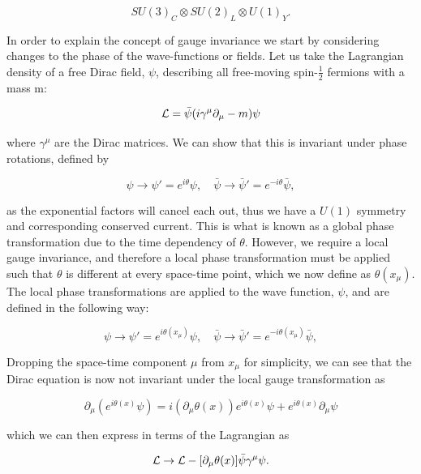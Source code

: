 \begin{equation}
SU(3)_C \otimes SU(2)_L \otimes U(1)_Y.
\end{equation}

In order to explain the concept of gauge invariance we start by considering changes to the phase of the wave-functions or fields. Let us take the Lagrangian density of a free Dirac field, $\psi$, describing all free-moving spin-$\frac{1}{2}$ fermions with a mass m:  

\begin{equation} \label{eqn-DiracLagrangian}
\mathcal{L} = \bar{\psi}(i \gamma^{\mu}\partial_{\mu}-m)\psi
\end{equation}

where $\gamma^{\mu}$ are the Dirac matrices. We can show that this is invariant under phase rotations, defined by

\begin{equation}
\psi \to \psi'= e^{i \theta}\psi, \quad \bar{\psi} \to \bar{\psi}' = e^{- i \theta}\bar{\psi},
\end{equation}

as the exponential factors will cancel each out, thus we have a $U(1)$ symmetry and corresponding conserved current. This is what is known as a global phase transformation due to the time dependency of $\theta$. However, we require a local gauge invariance, and therefore a local phase transformation must be applied such that $\theta$ is different at every space-time point, which we now define as $\theta (x_{\mu})$. The local phase transformations are applied to the wave function, $\psi$, and are defined in the following way:

\begin{equation}
\psi \to \psi'= e^{i \theta(x_{\mu})}\psi, \quad \bar{\psi} \to \bar{\psi}' = e^{- i \theta(x_{\mu})}\bar{\psi},
\end{equation} 

Dropping the space-time component $\mu$ from $x_{\mu}$ for simplicity, we can see that the Dirac equation is now not invariant under the local gauge transformation as

\begin{equation}
\partial_{\mu} (e^{i\theta(x)}\psi) = i(\partial_{\mu}\theta(x))e^{i\theta(x)}\psi + e^{i\theta(x)} \partial_{\mu}\psi 
\end{equation}

which we can then express in terms of the Lagrangian as

\begin{equation}
\mathcal{L} \to \mathcal{L} - [\partial_{\mu} \theta(x)] \bar{\psi} \gamma^{\mu} \psi.
\end{equation}


